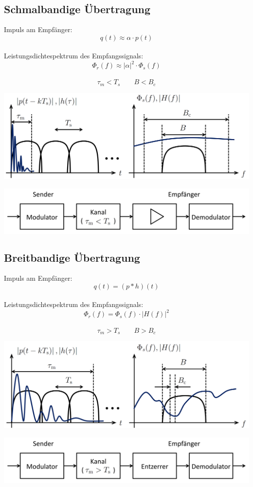 \subsection{Schmalbandige Übertragung}
Impuls am Empfänger:
\[ q(t) \approx \alpha \cdot p(t) \]
~\\
Leistungsdichtespektrum des Empfangssignals:
\[ \Phi_r(f) \approx |\alpha|^2 \cdot \Phi_s(f) \]
~\\
\[ \tau_m < T_s \qquad B < B_c \]
\begin{center}
	\includegraphics[width=.9\textwidth]{../fig/schmalband.png}
\end{center}
\begin{center}
	\includegraphics[width=.9\textwidth]{../fig/mod_schmalband.png}
\end{center}

\subsection{Breitbandige Übertragung}
Impuls am Empfänger:
\[ q(t) = (p*h)(t) \]
~\\
Leistungsdichtespektrum des Empfangssignals:
\[ \Phi_r(f) = \Phi_s(f) \cdot |H(f)|^2 \]
~\\
\[ \tau_m > T_s \qquad B > B_c \]
\begin{center}
	\includegraphics[width=.9\textwidth]{../fig/breitband.png}
\end{center}
\begin{center}
	\includegraphics[width=.9\textwidth]{../fig/mod_breitband.png}
\end{center}

